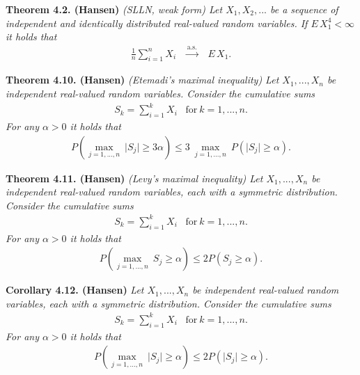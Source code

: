 \documentclass[a4paper,10pt,openany]{book}
\begin{document}
\textbf{Theorem 4.2. (Hansen)} \emph{(SLLN, weak form) Let \(X_1,X_2,...\) be a sequence of independent and identically distributed real-valued random variables. If \(E\, X_1^4<\infty\) it holds that}
\begin{align*}
    \frac{1}{n}\sum_{i=1}^n X_i \hspace{10pt}\stackrel{\text{a.s.}}{\to} \hspace{10pt}E\, X_1.\tag{4.3}
\end{align*}

\textbf{Theorem 4.10. (Hansen)} \emph{(Etemadi's maximal inequality) Let \(X_1,...,X_n\) be independent real-valued random variables. Consider the cumulative sums}
\begin{align*}
    S_k=\sum_{i=1}^kX_i\hspace{10pt}\text{for}\ k=1,..., n.
\end{align*}
\emph{For any \(\alpha >0\) it holds that}
\begin{align*}
    P\left(\max_{j=1,...,n}\ \vert S_j\vert\ge 3\alpha\right)\le 3\ \max_{j=1,...,n}\ P(\vert S_j\vert \ge \alpha).\tag{4.11}
\end{align*}

\textbf{Theorem 4.11. (Hansen)} \emph{(Levy's maximal inequality) Let \(X_1,...,X_n\) be independent real-valued random variables, each with a symmetric distribution. Consider the cumulative sums}
\begin{align*}
    S_k=\sum_{i=1}^kX_i\hspace{10pt}\text{for}\ k=1,..., n.
\end{align*}
\emph{For any \(\alpha>0\) it holds that}
\begin{align*}
    P\left(\max_{j=1,...,n}\ S_j\ge \alpha\right)\le 2 P(S_j\ge \alpha).\tag{4.13}
\end{align*}

\textbf{Corollary 4.12. (Hansen)} \emph{Let \(X_1,...,X_n\) be independent real-valued random variables, each with a symmetric distribution. Consider the cumulative sums}
\begin{align*}
    S_k=\sum_{i=1}^kX_i\hspace{10pt}\text{for}\ k=1,..., n.
\end{align*}
\emph{For any \(\alpha>0\) it holds that}
\begin{align*}
    P\left(\max_{j=1,...,n}\ \vert S_j\vert\ge \alpha\right)\le 2 P(\vert S_j\vert\ge \alpha).\tag{4.14}
\end{align*}
\end{document}
